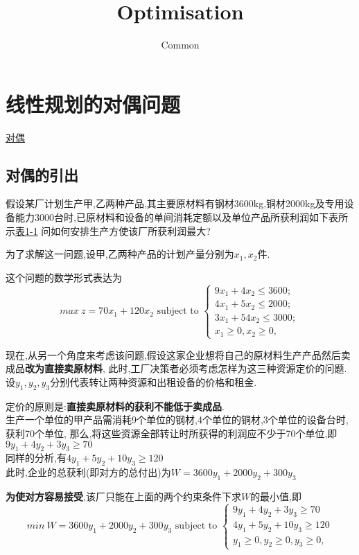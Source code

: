 \documentclass{article}
\begin{document}
\title{Optimisation}
\author{Common}
\maketitle
\newpage
\tableofcontents
\newpage

\section{线性规划的对偶问题}
\href{http://course.cug.edu.cn/cugFirst/operational\_research/main/charpter2/p1.htm}{对偶}

\subsection{对偶的引出}
假设某厂计划生产甲,乙两种产品,其主要原材料有钢材3600kg,铜材2000kg及专用设备能力3000台时,已原材料和设备的单间消耗定额以及单位产品所获利润如下表所示\href{http://course.cug.edu.cn/cugFirst/operational\_research/main/charpter1/p1.files/image001.gif}{表1-1}
问如何安排生产方使该厂所获利润最大?

为了求解这一问题,设甲,乙两种产品的计划产量分别为$x_1, x_2$件.

这个问题的数学形式表达为
\begin{equation}
max\ z = 70x_1 + 120x_2
\mbox{ subject to }
\left\{
  \begin{array}{ll}
		 9x_1 + 4 x_2 \leq 3600; \\
		 4x_1 + 5 x_2 \leq 2000; \\
		 3x_1 + 54 x_2 \leq 3000; \\
		 x_1 \geq 0, x_2 \geq 0,
  \end{array}
\right.
\label{dual.original}
\end{equation}

现在,从另一个角度来考虑该问题,假设这家企业想将自己的原材料生产产品然后卖成品\textbf{改为直接卖原材料},
此时,工厂决策者必须考虑怎样为这三种资源定价的问题.
设$y_1, y_2, y_3$分别代表转让两种资源和出租设备的价格和租金.

定价的原则是:\textbf{直接卖原材料的获利不能低于卖成品}.\\
生产一个单位的甲产品需消耗9个单位的钢材,4个单位的铜材,3个单位的设备台时,获利70个单位,
那么,将这些资源全部转让时所获得的利润应不少于70个单位,即$9y_1 + 4y_2 + 3y_3 \geq 70$\\
同样的分析,有$4y_1 + 5y_2 + 10y_3 \geq 120$\\
此时,企业的总获利(即对方的总付出)为$W = 3600y_1 + 2000y_2 + 300y_3$

\textbf{为使对方容易接受},该厂只能在上面的两个约束条件下求$W$的最小值,即
\begin{equation}
min\ W = 3600y_1 + 2000y_2 + 300y_3
\mbox{ subject to }
\left\{
  \begin{array}{ll}
		9y_1 + 4y_2 + 3y_3 \geq 70 \\
		4y_1 + 5y_2 + 10y_3 \geq 120 \\
		y_1 \geq 0, y_2 \geq 0, y_3 \geq 0,
  \end{array}
\right.
\label{dual.dual}
\end{equation}
\end{document}
